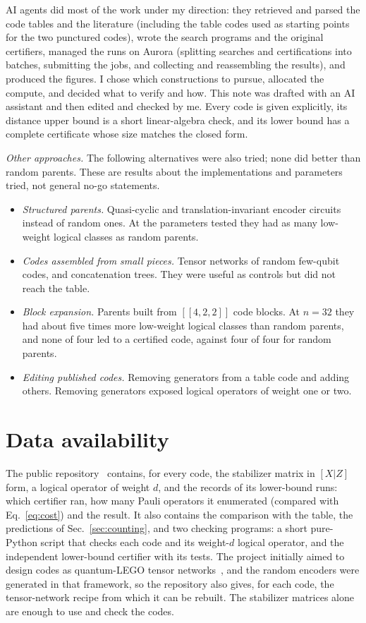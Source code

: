 \documentclass[reprint,pra,superscriptaddress,nofootinbib]{revtex4-2}
\begin{document}
AI agents did most of the work under my direction: they retrieved and parsed the code tables and the literature
(including the table codes used as starting points for the two punctured codes), wrote the search programs and the
original certifiers, managed the runs on Aurora (splitting searches and certifications into batches, submitting the
jobs, and collecting and reassembling the results), and produced the figures. I chose which constructions to pursue,
allocated the compute, and decided what to verify and how. This note was drafted with an AI assistant and then edited
and checked by me. Every code is given explicitly, its distance upper bound is a short linear-algebra check, and its
lower bound has a complete certificate whose size matches the closed form.

\emph{Other approaches.} The following alternatives were also tried; none did better than random parents. These are
results about the implementations and parameters tried, not general no-go statements.
\begin{itemize}\setlength{\itemsep}{0pt}\setlength{\parskip}{0pt}
\item \emph{Structured parents.} Quasi-cyclic and translation-invariant encoder circuits instead of random ones. At
the parameters tested they had as many low-weight logical classes as random parents.
\item \emph{Codes assembled from small pieces.} Tensor networks of random few-qubit codes, and concatenation trees.
They were useful as controls but did not reach the table.
\item \emph{Block expansion.} Parents built from $[[4,2,2]]$ code blocks. At $n=32$ they had about five times more
low-weight logical classes than random parents, and none of four led to a certified code, against four of four for
random parents.
\item \emph{Editing published codes.} Removing generators from a table code and adding others. Removing generators
exposed logical operators of weight one or two.
\end{itemize}

\section*{Data availability}
The public repository~\cite{repo} contains, for every code, the stabilizer matrix in $[X|Z]$ form, a logical operator of
weight $d$, and the records of its lower-bound runs: which certifier ran, how many Pauli operators it enumerated
(compared with Eq.~\eqref{eq:cost}) and the result. It also contains the comparison with the table, the predictions of
Sec.~\ref{sec:counting}, and two checking programs: a short pure-Python script that checks each code and its weight-$d$
logical operator, and the independent lower-bound certifier with its tests. The project initially aimed to design codes
as quantum-LEGO tensor networks~\cite{lego}, and the random encoders were generated in that framework, so the repository
also gives, for each code, the tensor-network recipe from which it can be rebuilt. The stabilizer matrices alone are
enough to use and check the codes.
\end{document}
